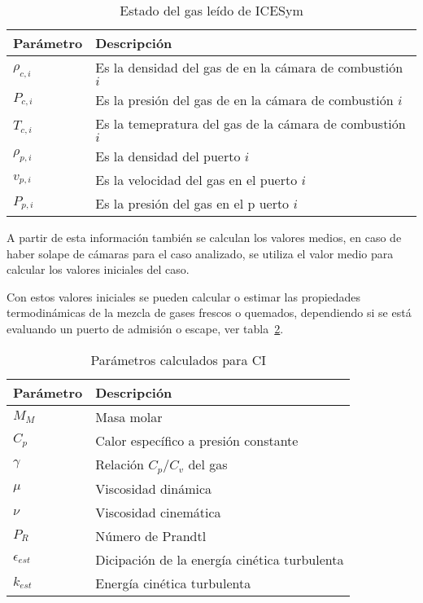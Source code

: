 \begin{table}
  \centering
  \begin{tabular}{ll}\toprule
    Parámetro & Descripción \\ \midrule
    $\rho_{c,i}$ & Es la densidad del gas de en la cámara de combustión $i$\\
    $P_{c,i}$ & Es la presión del gas de en la cámara de combustión $i$ \\
    $T_{c,i}$ & Es la temepratura del gas de la cámara de combustión $i$ \\
    $\rho_{p,i}$ & Es la densidad del puerto $i$ \\
    $v_{p,i}$ & Es la velocidad del gas en el puerto $i$ \\
    $P_{p,i}$ & Es la presión del gas en el p uerto $i$ \\ \bottomrule
    \end{tabular}
    \caption{Estado del gas leído de ICESym}\label{tab:estado_gas_icesym}
\end{table}

A partir de esta información también se calculan los valores medios, en caso de
haber solape de cámaras para el caso analizado, se utiliza el valor medio para
calcular los valores iniciales del caso.

Con estos valores iniciales se pueden calcular o estimar las propiedades
termodinámicas de la mezcla de gases frescos o quemados, dependiendo si se está
evaluando un puerto de admisión o escape, ver tabla~\ref{tab:ci_calculados}.
%

\begin{table}
  \centering
  \begin{tabular}{ll}\toprule
    Parámetro & Descripción \\ \midrule
    $M_{M}$ & Masa molar \\
    $C_{p}$ & Calor específico a presión constante \\
    $\gamma$ & Relación $C_{p}/C_{v}$ del gas \\
    $\mu$ & Viscosidad dinámica \\
    $\nu$ & Viscosidad cinemática \\
    $P_{R}$ & Número de Prandtl \\
    $\epsilon_{est}$ & Dicipación de la energía cinética turbulenta \\
    $k_{est}$ & Energía cinética turbulenta \\ \bottomrule
    \end{tabular}
    \caption{Parámetros calculados para CI}\label{tab:ci_calculados}
\end{table}


